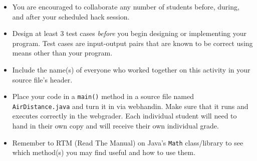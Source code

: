 \documentclass[12pt]{scrartcl}
\begin{document}
\begin{itemize}
  \item You are encouraged to collaborate any number of students 
  before, during, and after your scheduled hack session.  
  \item Design at least 3 test cases \emph{before} you begin
  designing or implementing your program.  Test cases are 
  input-output pairs that are known to be correct using means
  other than your program.
  \item Include the name(s) of everyone who worked together on
  this activity in your source file's header.
  \item Place your code in a \texttt{main()} method in 
    a source file named \texttt{AirDistance.java} and 
    turn it in via webhandin.  Make sure that it runs and executes 
    correctly in the webgrader. Each individual
    student will need to hand in their own copy and will receive their
    own individual grade.
  \item Remember to RTM (Read The Manual) on Java's 
    \texttt{Math} class/library to see which method(s) 
    you may find useful and how to use them.
\end{itemize}
  
\end{document}
